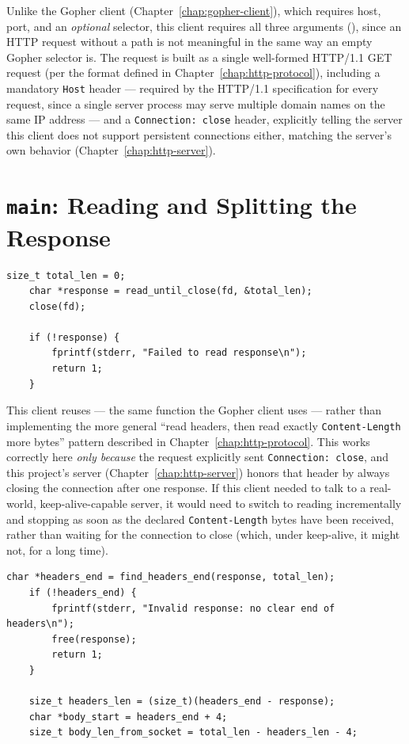 Unlike the Gopher client (Chapter~\ref{chap:gopher-client}), which requires host, port, and an \emph{optional} selector, this client requires all three arguments (), since an HTTP request without a path is not meaningful in the same way an empty Gopher selector is. The request is built as a single well-formed HTTP/1.1 GET request (per the format defined in Chapter~\ref{chap:http-protocol}), including a mandatory \texttt{Host} header --- required by the HTTP/1.1 specification for every request, since a single server process may serve multiple domain names on the same IP address --- and a \texttt{Connection: close} header, explicitly telling the server this client does not support persistent connections either, matching the server's own behavior (Chapter~\ref{chap:http-server}).

\section{\texttt{main}: Reading and Splitting the Response}

\begin{lstlisting}[style=cstyle]
    size_t total_len = 0;
    char *response = read_until_close(fd, &total_len);
    close(fd);

    if (!response) {
        fprintf(stderr, "Failed to read response\n");
        return 1;
    }
\end{lstlisting}

\begin{note}
This client reuses  --- the same function the Gopher client uses --- rather than implementing the more general ``read headers, then read exactly \texttt{Content-Length} more bytes'' pattern described in Chapter~\ref{chap:http-protocol}. This works correctly here \emph{only because} the request explicitly sent \texttt{Connection: close}, and this project's server (Chapter~\ref{chap:http-server}) honors that header by always closing the connection after one response. If this client needed to talk to a real-world, keep-alive-capable server, it would need to switch to reading incrementally and stopping as soon as the declared \texttt{Content-Length} bytes have been received, rather than waiting for the connection to close (which, under keep-alive, it might not, for a long time).
\end{note}

\begin{lstlisting}[style=cstyle]
    char *headers_end = find_headers_end(response, total_len);
    if (!headers_end) {
        fprintf(stderr, "Invalid response: no clear end of headers\n");
        free(response);
        return 1;
    }

    size_t headers_len = (size_t)(headers_end - response);
    char *body_start = headers_end + 4;
    size_t body_len_from_socket = total_len - headers_len - 4;
\end{lstlisting}

